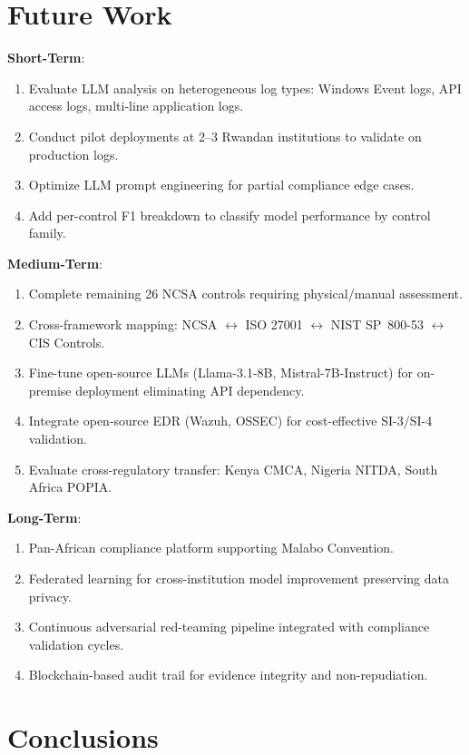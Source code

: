 \documentclass[futureinternet,article,submit,pdftex,moreauthors]{Definitions/mdpi}
\begin{document}
\section{Future Work}

\textbf{Short-Term}:
\begin{enumerate}
\item Evaluate LLM analysis on heterogeneous log types: Windows Event logs, API access logs,
multi-line application logs.
\item Conduct pilot deployments at 2--3 Rwandan institutions to validate on production logs.
\item Optimize LLM prompt engineering for partial compliance edge cases.
\item Add per-control F1 breakdown to classify model performance by control family.
\end{enumerate}

\textbf{Medium-Term}:
\begin{enumerate}
\item Complete remaining 26 NCSA controls requiring physical/manual assessment.
\item Cross-framework mapping: NCSA $\leftrightarrow$ ISO 27001 $\leftrightarrow$ NIST
SP~800-53 $\leftrightarrow$ CIS Controls.
\item Fine-tune open-source LLMs (Llama-3.1-8B, Mistral-7B-Instruct) for on-premise
deployment eliminating API dependency.
\item Integrate open-source EDR (Wazuh, OSSEC) for cost-effective SI-3/SI-4 validation.
\item Evaluate cross-regulatory transfer: Kenya CMCA, Nigeria NITDA, South Africa POPIA.
\end{enumerate}

\textbf{Long-Term}:
\begin{enumerate}
\item Pan-African compliance platform supporting Malabo Convention.
\item Federated learning for cross-institution model improvement preserving data privacy.
\item Continuous adversarial red-teaming pipeline integrated with compliance validation cycles.
\item Blockchain-based audit trail for evidence integrity and non-repudiation.
\end{enumerate}

\section{Conclusions}
\label{sec:conclusion}
\end{document}
